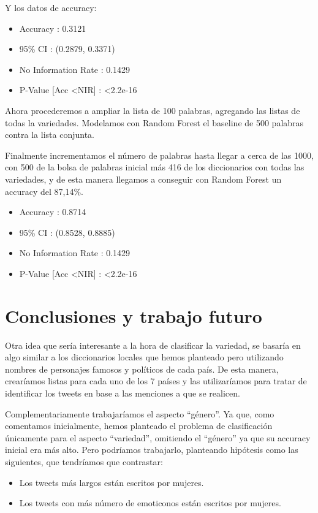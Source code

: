 \documentclass[11pt,a4paper]{article}
\begin{document}
Y los datos de accuracy:

\begin{itemize}
    \item Accuracy : 0.3121   
    \item 95\% CI : (0.2879, 0.3371)
    \item No Information Rate : 0.1429  
    \item P-Value [Acc \textless NIR] :  \textless  2.2e-16
\end{itemize}


Ahora procederemos a ampliar la lista de 100 palabras, agregando las listas de todas la variedades. Modelamos con Random Forest el baseline de 500 palabras contra la lista conjunta. 



Finalmente incrementamos el n\'umero de palabras hasta llegar a cerca de las 1000, con 500 de la bolsa de palabras inicial más 416 de los diccionarios con todas las variedades, y de esta manera llegamos a conseguir con Random Forest un accuracy del 87,14\%.

\begin{itemize}
    \item Accuracy : 0.8714 
    \item 95\% CI : (0.8528, 0.8885)
    \item No Information Rate : 0.1429  
    \item P-Value [Acc \textless NIR] :  \textless  2.2e-16
\end{itemize}




\section{Conclusiones y trabajo futuro}

Otra idea que ser\'ia interesante a la hora de clasificar la variedad, se basar\'ia en algo similar a los diccionarios locales que hemos planteado pero utilizando nombres de personajes famosos y pol\'iticos de cada pa\'is. De esta manera, crear\'iamos listas para cada uno de los 7 pa\'ises y las utilizar\'iamos para tratar de identificar los tweets en base a las menciones a que se realicen.

Complementariamente trabajar\'iamos el aspecto “g\'enero”. Ya que, como comentamos inicialmente, hemos planteado el problema de clasificaci\'on \'unicamente para el aspecto “variedad”, omitiendo el “g\'enero” ya que su accuracy inicial era m\'as alto. Pero podr\'iamos trabajarlo, planteando hip\'otesis como las siguientes, que tendr\'iamos que contrastar: 

\begin{itemize}
    \item Los tweets m\'as largos est\'an escritos por mujeres.
    \item Los tweets con m\'as n\'umero de emoticonos est\'an escritos por mujeres.
\end{itemize}
\end{document}
